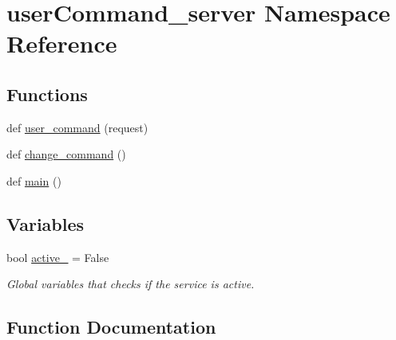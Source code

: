 \hypertarget{namespaceuser_command__server}{}\section{user\+Command\+\_\+server Namespace Reference}
\label{namespaceuser_command__server}
\subsection*{Functions}
\begin{DoxyCompactItemize}
\item 
def \hyperlink{namespaceuser_command__server_af58afa8d0e79ec90aa8494db7e5de235}{user\+\_\+command} (request)
\item 
def \hyperlink{namespaceuser_command__server_ad36c1fe75d13f863cf878daf21d670de}{change\+\_\+command} ()
\item 
def \hyperlink{namespaceuser_command__server_a9c43146425e0634e73349dd86c2bb711}{main} ()
\end{DoxyCompactItemize}
\subsection*{Variables}
\begin{DoxyCompactItemize}
\item 
bool \hyperlink{namespaceuser_command__server_a020cb62f8292048dd659ebb509d8ef3d}{active\+\_\+} = False
\begin{DoxyCompactList}\small\item\em Global variables that checks if the service is active. \end{DoxyCompactList}\end{DoxyCompactItemize}


\subsection{Function Documentation}
